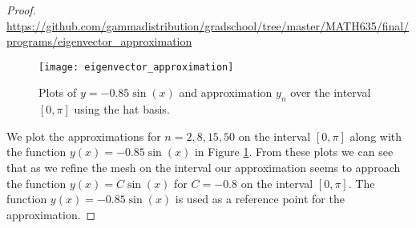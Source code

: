 \begin{proof}
\url{https://github.com/gammadistribution/gradschool/tree/master/MATH635/final/programs/eigenvector_approximation}

  \begin{figure}[h!]
    \begin{center}
      \texttt{[image: eigenvector\_approximation]}
    \end{center}
    \caption{Plots of $y=-0.85\sin(x)$ and approximation $y_n$ over the interval $[0, \pi]$
      using the hat basis.}\label{eigen}
  \end{figure}

  We plot the approximations for $n=2, 8, 15, 50$ on the interval $[0, \pi]$
  along with the function $y(x) = -0.85\sin(x)$ in Figure \ref{eigen}. From these
  plots we can see that as we refine the mesh on the interval our approximation
  seems to approach the function $y(x) = C\sin(x)$ for $C = -0.8$ on the interval $[0, \pi]$.
  The function $y(x)=-0.85\sin(x)$ is used as a reference point for the approximation.

\end{proof}
